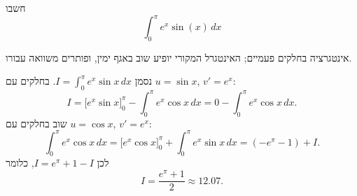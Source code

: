 
\begin{question}
חשבו
\[ \int_0^{\pi}e^x\sin(x)\,dx \]
\end{question}

\begin{hint}
אינטגרציה בחלקים פעמיים; האינטגרל המקורי יופיע שוב באגף ימין, ופותרים משוואה עבורו.
\end{hint}

\begin{solution}
נסמן $I=\int_0^\pi e^x\sin x\,dx$. בחלקים עם $u=\sin x$, $v'=e^x$:
\[ I=\big[e^x\sin x\big]_0^\pi-\int_0^\pi e^x\cos x\,dx=0-\int_0^\pi e^x\cos x\,dx. \]
שוב בחלקים עם $u=\cos x$, $v'=e^x$:
\[ \int_0^\pi e^x\cos x\,dx=\big[e^x\cos x\big]_0^\pi+\int_0^\pi e^x\sin x\,dx=(-e^\pi-1)+I. \]
לכן $I=e^\pi+1-I$, כלומר
\[ I=\boxed{\frac{e^\pi+1}{2}}\approx12.07. \]
\end{solution}
